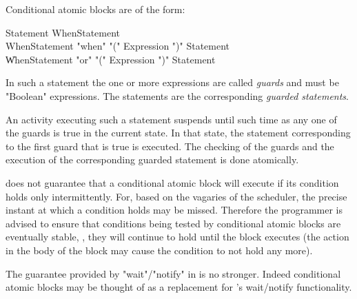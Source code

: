 {Conditional atomic blocks are of the form:

\begin{grammar}
Statement \:  WhenStatement \\
WhenStatement \:  \xcd"when" \xcd"(" Expression \xcd")" Statement \\
            \| WhenStatement \xcd"or" \xcd"(" Expression \xcd")" Statement 
\end{grammar}

In such a statement the one or more expressions are called {\em
guards} and must be \xcd"Boolean" expressions. The statements are the
corresponding {\em guarded statements}.  

An activity executing such a statement suspends until such time as any
one of the guards is true in the current state. In that state, the
statement corresponding to the first guard that is true is executed.
The checking of the guards and the execution of the corresponding
guarded statement is done atomically. 

\Xten{} does not guarantee that a conditional atomic block
will execute if its condition holds only intermittently. For, based on
the vagaries of the scheduler, the precise instant at which a
condition holds may be missed. Therefore the programmer is advised to
ensure that conditions being tested by conditional atomic blocks are
eventually stable, \ie, they will continue to hold until the block
executes (the action in the body of the block may cause the condition
to not hold any more).


\begin{rationale}
The guarantee provided by \xcd"wait"/\xcd"notify" in \java{} is no
stronger. Indeed conditional atomic blocks may be thought of as a
replacement for \java's wait/notify functionality.
\end{rationale} 

}
